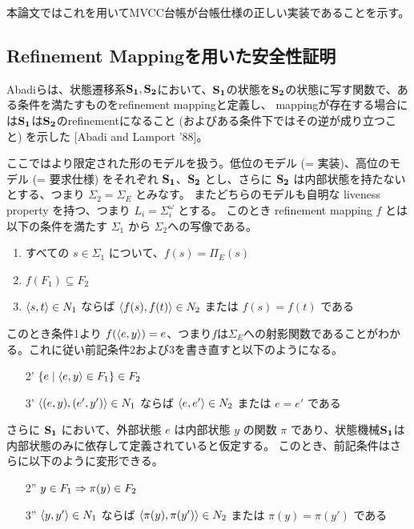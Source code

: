 \documentclass{fose2019}           %
\begin{document}
本論文ではこれを用いてMVCC台帳が台帳仕様の正しい実装であることを示す。

\subsection{Refinement Mappingを用いた安全性証明}

Abadiらは、状態遷移系$\mathbf{S_{1}},\mathbf{S_{2}}$において、$\mathbf{S_{1}}$の状態を$\mathbf{S_{2}}$の状態に写す関数で、ある条件を満たすものをrefinement mappingと定義し、
mappingが存在する場合には$\mathbf{S_{1}}$は$\mathbf{S_{2}}$のrefinementになること (およびある条件下ではその逆が成り立つこと) を示した [Abadi and Lamport '88]。

ここではより限定された形のモデルを扱う。低位のモデル (= 実装)、高位のモデル (= 要求仕様) をそれぞれ $\mathbf{S_{1}}$、$\mathbf{S_{2}}$ とし、さらに $\mathbf{S_{2}}$ は内部状態を持たないとする、つまり $\Sigma_2 = \Sigma_E$ とみなす。
またどちらのモデルも自明な liveness property を持つ、つまり $L_i = \Sigma_i^{\omega}$ とする。
このとき refinement mapping $f$ とは以下の条件を満たす $\Sigma_1$ から $\Sigma_2$への写像である。

\begin{enumerate}
\item すべての $s\in\Sigma_1$ について、$f(s) = \Pi_E(s)$
\item $f(F_1) \subseteq F_2$
\item $\langle  s,t  \rangle\in N_1$ ならば $\langle f(s), f(t) \rangle \in N_2$ または $f(s)=f(t)$ である 
\end{enumerate}

このとき条件1より $f(\langle e, y \rangle) = e$、つまり$f$は$\Sigma_E$への射影関数であることがわかる。これに従い前記条件2および3を書き直すと以下のようになる。

\begin{enumerate}
\item[2'] $\{ e \mid \langle e,y \rangle\in F_1 \} \in F_2$
\item[3'] $\langle (e,y), (e',y') \rangle\in N_1$ ならば $\langle e,e' \rangle \in N_2$ または $e=e'$ である 
\end{enumerate}

さらに $\mathbf{S_{1}}$ において、外部状態 $e$ は内部状態 $y$ の関数 $\pi$ であり、状態機械$\mathbf{S_{1}}$は内部状態のみに依存して定義されていると仮定する。
このとき、前記条件はさらに以下のように変形できる。

\begin{enumerate}
\item[2''] $y \in F_1 \Rightarrow \pi(y) \in F_2$
\item[3''] $\langle y,y' \rangle\in N_1$ ならば $\langle \pi(y),\pi(y') \rangle \in N_2$ または $\pi(y)=\pi(y')$ である 
\end{enumerate}
\end{document}
